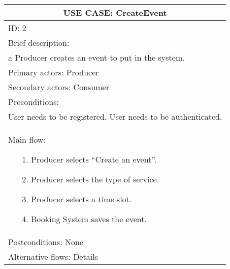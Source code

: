 \documentclass{article}
\begin{document}
\begin{table}[h!]
	\centering
	\begin{tabular}{|p{10cm}|}
		\hline
		\multicolumn{1}{|c|}{\textbf{USE CASE: CreateEvent}}\\
		\hline
		ID: 2\\
		\hline
		Brief description:\\a Producer creates an event to put in the system.\\
		\hline
		Primary actors: Producer \\
		\hline
		Secondary actors: Consumer \\
		\hline
		Preconditions:\\User needs to be registered. User needs to be authenticated.\\
		\hline
		Main flow:
		\vspace{-0.5\baselineskip}
		\begin{itemize}[leftmargin=1.2em]
			\item[1.] Producer selects “Create an event”.
			\vspace{-0.5\baselineskip}
			\item[2.] Producer selects the type of service.
			\vspace{-0.5\baselineskip}
			\item[3.] Producer selects a time slot.
			\vspace{-0.5\baselineskip}
			\item[4.] Booking System saves the event.
		\end{itemize}
		\vspace{-1.5\baselineskip}
		\\
		\hline
		Postconditions: None \\
		\hline
		Alternative flows: Details \\
		\hline
	\end{tabular}
\end{table}
\end{document}
